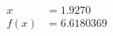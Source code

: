 \documentclass[preview]{standalone}
\begin{document}
\begin{align*}
x &= 1.9270\\f(x) &= 6.6180369
\end{align*}
\end{document}
